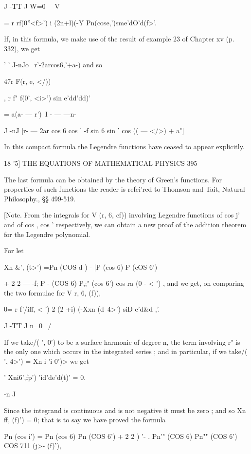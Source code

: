 J -TT J W=0 \ \  V 

= r rf(0''<f>') i (2n+l)(-Y Pn(cose,')sme'dO'd(f>'. 

If, in this formula, we make use of the result of example 23 of Chapter xv 
(p. 332), we get 

 ' '  J-nJo \ r'-2arcos6,'+a-)  
and so 

47r F(r, e, </)) 

, r f" f(0', <i>') sin e'dd'dd)' 

= a(a- — r')\ I  - — —n- 

J -nJ [r- — 2ar  cos 6 cos  ' -f sin 6 sin  ' cos ((  — </>)  + a"]  

In this compact formula the Legendre functions have ceased to appear 
explicitly. 



18 '5] THE EQUATIONS OF MATHEMATICAL PHYSICS 395 

The last formula can be obtained by the theory of Green's functions. For properties 
of such functions the reader is refei'red to Thomson and Tait, Natural Philosophy., 
§§ 499-519. 

[Note. From the integrals for V (r, 6, cf)) involving Legendre functions of cos  j' and 
of cos , cos ' respectively, we can obtain a new proof of the addition theorem for the 
Legendre polynomial. 

For let 

Xn  \&', (t>') =Pn (COS d ) - |P  (cos 6) P  (cOS 6')  

+ 2 2  — -f; P - (COS 6) P,;" (cos 6') cos ra (0 - < ') , 
and we get, on comparing the two formulae for V  r, 6, (f)), 

0= r f'/iff, < ') 2 (2 +i) (-Xxn (d\ 4>') siD e'd\&d ,'. 

J -TT J n=0 \ / 

If we take/( ', 0') to be a surface harmonic of degree n, the term involving r" is the only 
one which occurs in the integrated series ; and in particular, if we take/( ', 4>') = Xn i 'i 0')> 
we get 

' Xni6',fp')   'id'de'd(t)' = 0. 



-n J 

Since the integrand is continuous and is not negative it must be zero ; and so 
Xn ff, (f)') = 0; that is to say we have proved the formula 

Pn (cos  i') = Pn (cos 6) Pn (COS 6') + 2 2 ) '- . Pn'" (COS 6) Pn"" (COS 6') COS 711  (j>- (f)'), 

